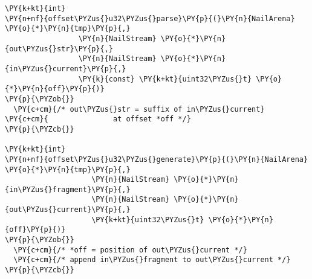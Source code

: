 \begin{Verbatim}[commandchars=\\\{\},codes={\catcode`\$=3\catcode`\^=7\catcode`\_=8}]
\PY{k+kt}{int}
\PY{n+nf}{offset\PYZus{}u32\PYZus{}parse}\PY{p}{(}\PY{n}{NailArena} \PY{o}{*}\PY{n}{tmp}\PY{p}{,}
                 \PY{n}{NailStream} \PY{o}{*}\PY{n}{out\PYZus{}str}\PY{p}{,}
                 \PY{n}{NailStream} \PY{o}{*}\PY{n}{in\PYZus{}current}\PY{p}{,}
                 \PY{k}{const} \PY{k+kt}{uint32\PYZus{}t} \PY{o}{*}\PY{n}{off}\PY{p}{)}
\PY{p}{\PYZob{}}
  \PY{c+cm}{/* out\PYZus{}str = suffix of in\PYZus{}current}
\PY{c+cm}{               at offset *off */}
\PY{p}{\PYZcb{}}

\PY{k+kt}{int}
\PY{n+nf}{offset\PYZus{}u32\PYZus{}generate}\PY{p}{(}\PY{n}{NailArena} \PY{o}{*}\PY{n}{tmp}\PY{p}{,}
                    \PY{n}{NailStream} \PY{o}{*}\PY{n}{in\PYZus{}fragment}\PY{p}{,}
                    \PY{n}{NailStream} \PY{o}{*}\PY{n}{out\PYZus{}current}\PY{p}{,}
                    \PY{k+kt}{uint32\PYZus{}t} \PY{o}{*}\PY{n}{off}\PY{p}{)}
\PY{p}{\PYZob{}}
  \PY{c+cm}{/* *off = position of out\PYZus{}current */}
  \PY{c+cm}{/* append in\PYZus{}fragment to out\PYZus{}current */}
\PY{p}{\PYZcb{}}
\end{Verbatim}

